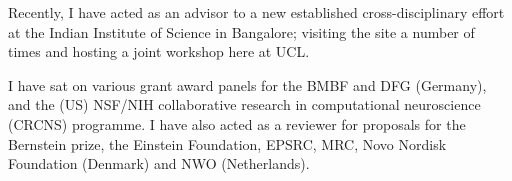 Recently, I have acted as an advisor to a new established cross-disciplinary effort at the Indian Institute of Science in Bangalore; visiting the site a
number of times and hosting a joint workshop here at UCL.

I have sat on various grant award panels for the BMBF and DFG (Germany), and the (US) NSF/NIH collaborative research
in computational neuroscience (CRCNS) programme. I have also acted as a reviewer for proposals for the Bernstein prize, the Einstein Foundation, EPSRC, MRC, Novo Nordisk Foundation (Denmark) and NWO (Netherlands).




% 
